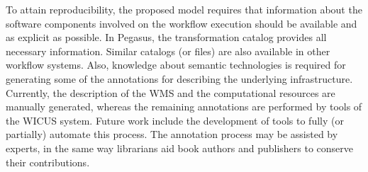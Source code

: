 

To attain reproducibility, the proposed model requires that information about
the software components involved on the workflow execution should be available
and as explicit as possible. In Pegasus, the transformation catalog provides 
all necessary information. Similar catalogs (or files) are also available in other
workflow systems. 
Also, knowledge about semantic technologies is required for generating 
some of the annotations for describing the underlying infrastructure. Currently,
the description of the WMS and the computational resources are manually 
generated, whereas the remaining annotations are performed by tools of the 
WICUS system. Future work include the development of tools to fully (or 
partially) automate this process. The annotation process may be assisted 
by experts, in the same way librarians aid book authors and publishers to 
conserve their contributions.

